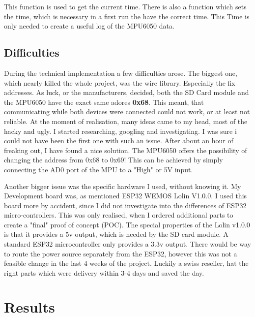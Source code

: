 This function is used to get the current time. There is also a function which sets the time, which is necessary in a first run the have the correct time. This Time is only needed to create a useful log of the MPU6050 data.

\subsection{Difficulties}

During the technical implementation a few difficulties arose. The biggest one, which nearly killed the whole project, was the wire library. Especially the fix addresses. As luck, or the manufacturers, decided, both the SD Card module and the MPU6050 have the exact same adores \textbf{0x68}. This meant, that communicating while both devices were connected could not work, or at least not reliable. At the moment of realisation, many ideas came to my head, most of the hacky and ugly. I started researching, googling and investigating. I was sure i could not have been the first one with such an issue. After about an hour of freaking out, I have found a nice solution. 
The MPU6050 offers the possibility of changing the address from 0x68 to 0x69! This can be achieved by simply connecting the AD0 port of the MPU to a "High" or 5V input.

Another bigger issue was the specific hardware I used, without knowing it. My Development board was, as mentioned ESP32 WEMOS Lolin V1.0.0. I used this board more by accident, since I did not investigate into the differences of ESP32 micro-controllers. This was only realised, when I ordered additional parts to create a "final" proof of concept (POC). The special properties of the Lolin v1.0.0 is that it provides a 5v output, which is needed by the SD card module. A standard ESP32 microcontroller only provides a 3.3v output. There would be way to route the power source separately from the ESP32, however this was not a feasible change in the last 4 weeks of the project. Luckily a swiss reseller, hat the right parts which were delivery within 3-4 days and saved the day.

\section{Results}

